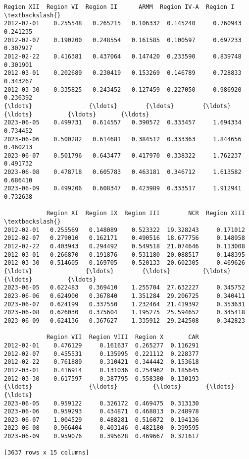 \documentclass[11pt]{article}
\makeatletter
\newcommand{\boxspacing}{\kern\kvtcb@left@rule\kern\kvtcb@boxsep}
\newcommand{\prompt}[4]{
        {\ttfamily\llap{{\color{#2}[#3]:\hspace{3pt}#4}}\vspace{-\baselineskip}}
    }
\makeatother
\begin{document}
            \begin{tcolorbox}[breakable, size=fbox, boxrule=.5pt, pad at break*=1mm, opacityfill=0]
\prompt{Out}{outcolor}{52}{\boxspacing}
\begin{Verbatim}[commandchars=\\\{\}]
            Region XII  Region VI  Region II      ARMM  Region IV-A  Region I  \textbackslash{}
2012-02-01    0.255548   0.265215   0.106332  0.145240     0.760943  0.241235
2012-02-07    0.190200   0.248554   0.161585  0.100597     0.697233  0.307927
2012-02-22    0.416381   0.437064   0.147420  0.233590     0.839748  0.301901
2012-03-01    0.202689   0.230419   0.153269  0.146789     0.728833  0.343267
2012-03-30    0.335825   0.243452   0.127459  0.227050     0.986920  0.236392
{\ldots}                {\ldots}        {\ldots}        {\ldots}       {\ldots}          {\ldots}       {\ldots}
2023-06-05    0.499731   0.614557   0.390572  0.333457     1.694334  0.734452
2023-06-06    0.500282   0.614681   0.384512  0.333363     1.844656  0.460213
2023-06-07    0.501796   0.643477   0.417970  0.338322     1.762237  0.491732
2023-06-08    0.478718   0.605783   0.463181  0.346712     1.613582  0.686410
2023-06-09    0.499206   0.608347   0.423989  0.333517     1.912941  0.732638

            Region XI  Region IX  Region III        NCR  Region XIII  \textbackslash{}
2012-02-01   0.255569   0.148089    0.523322  19.328243     0.171012
2012-02-07   0.279010   0.162171    0.490516  18.677756     0.148958
2012-02-22   0.403943   0.294492    0.549518  21.074646     0.113008
2012-03-01   0.266870   0.191876    0.531180  20.088517     0.148395
2012-03-30   0.514605   0.169705    0.520133  20.602305     0.469626
{\ldots}               {\ldots}        {\ldots}         {\ldots}        {\ldots}          {\ldots}
2023-06-05   0.622483   0.369410    1.255704  27.632227     0.345752
2023-06-06   0.624900   0.367840    1.351284  29.206725     0.340411
2023-06-07   0.624199   0.337550    1.232464  21.419392     0.353631
2023-06-08   0.626030   0.375604    1.195275  25.594652     0.345418
2023-06-09   0.624136   0.367627    1.335912  29.242508     0.342823

            Region VII  Region VIII  Region X       CAR
2012-02-01    0.476129     0.161637  0.265277  0.116291
2012-02-07    0.455531     0.135995  0.221112  0.228377
2012-02-22    0.761889     0.310421  0.344442  0.153618
2012-03-01    0.416914     0.131036  0.254962  0.185645
2012-03-30    0.617597     0.387795  0.558380  0.130193
{\ldots}                {\ldots}          {\ldots}       {\ldots}       {\ldots}
2023-06-05    0.959122     0.326172  0.469475  0.313130
2023-06-06    0.959293     0.434871  0.468813  0.248978
2023-06-07    1.004529     0.488281  0.516072  0.194136
2023-06-08    0.966404     0.403146  0.482180  0.399595
2023-06-09    0.959076     0.395628  0.469667  0.321617

[3637 rows x 15 columns]
\end{Verbatim}
\end{tcolorbox}
        
\end{document}
